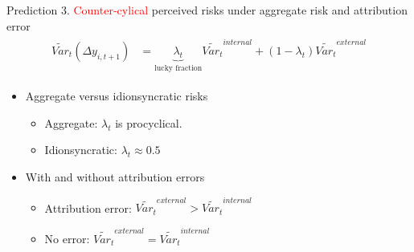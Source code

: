 \documentclass{beamer}
\begin{document}
\begin{frame}{Prediction 3. \textcolor{red}{Counter-cylical} perceived risks under aggregate risk and attribution error}
	\begin{eqnarray}
		\begin{split}
			\tilde {Var}_{t}(\Delta y_{i,t+1}) & = \underbrace{\lambda_t}_{\text{lucky fraction}} \tilde{Var_t}^{internal} + (1-\lambda_t) \tilde{Var_t}^{external} 
		\end{split}
	\end{eqnarray}
	\begin{itemize} 
		\item Aggregate  versus idionsyncratic risks
		\begin{itemize}
			\item Aggregate: $\lambda_t$ is procyclical.   
			\item Idionsyncratic: $\lambda_t \approx 0.5$ 
		\end{itemize}
		\item With and without attribution errors
		\begin{itemize}
			\item Attribution error: $\tilde{Var_t}^{external} >\tilde{Var_t}^{internal}$ 
			\item No error: $\tilde{Var_t}^{external} =\tilde{Var_t}^{internal}$
		\end{itemize}
	\end{itemize}
	
\end{frame}




\end{document}

